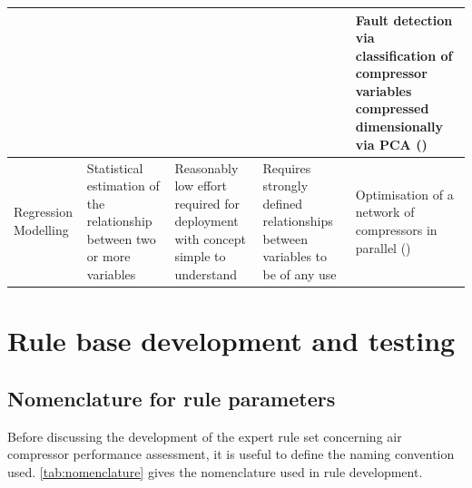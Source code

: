 \begin{center}
\begin{longtable}{p{}p{}p{}p{}p{}}
          &       &       &       & Fault detection via classification of compressor variables compressed dimensionally via PCA (\cite{Liu2009})\\
    \midrule
    Regression Modelling & Statistical estimation of the relationship between two or more variables & Reasonably low effort required for deployment with concept simple to understand & Requires strongly defined relationships between variables to be of any use & Optimisation of a network of compressors in parallel (\cite{Kopanos2015})\\ %
    \bottomrule
    \end{longtable}%
\end{center}
\twocolumn


\section{Rule base development and testing}
\label{sec:rules}

\subsection{Nomenclature for rule parameters}
\label{subsec:nomenclature}
Before discussing the development of the expert rule set concerning air compressor performance assessment, it is useful to define the naming convention used. \autoref{tab:nomenclature} gives the nomenclature used in rule development.

